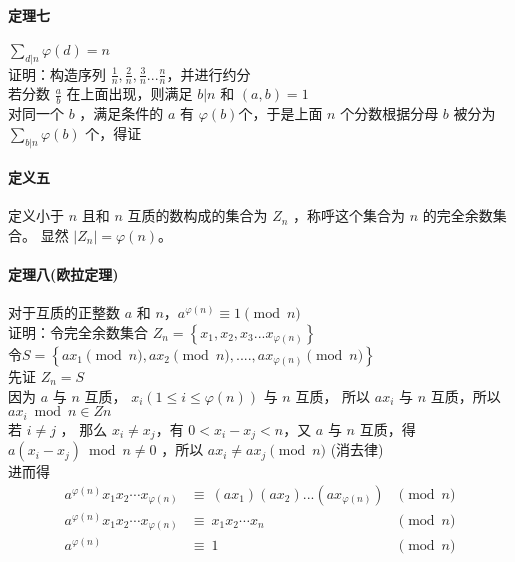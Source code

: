 	\paragraph{定理七}$\displaystyle \sum_{d|n}\varphi(d)=n$\\
	证明：构造序列 $\displaystyle \frac{1}{n},\frac{2}{n},\frac{3}{n}...\frac{n}{n}$，并进行约分\\
	若分数 $\frac{a}{b}$ 在上面出现，则满足 $b|n$ 和 $(a,b)=1$\\
	对同一个 $b$ ，满足条件的 $a$ 有 $\varphi(b)$个，于是上面 $n$ 个分数根据分母 $b$ 被分为 $\sum_{b|n}\varphi(b) $ 个，得证\\
	\paragraph{定义五}定义小于 $n$ 且和 $n$ 互质的数构成的集合为 $Z_n$ ，称呼这个集合为 $n$ 的完全余数集合。 显然 $\left|Z_n\right|=\varphi(n) $。
	\paragraph{定理八(欧拉定理)}对于互质的正整数 $a$ 和 $n$，$a^{\varphi(n)}\equiv1\pmod n$\\
	证明：令完全余数集合 $Z_n=\left \{x_1,x_2,x_3...x_{\varphi(n)}\right\}$
	\\令$S=\left\{ax_1\pmod n,ax_2\pmod n,....,ax_{\varphi(n)}\pmod n\right\}$ \\
	先证 $Z_n=S$\\
	因为 $a$ 与 $n$ 互质， $x_i(1 \le i \le \varphi(n))$ 与 $n$ 互质， 所以 $a x_i$  与 $n$ 互质，所以 $a  x_i  \bmod n \in Zn$ \\
	若 $i \neq j$ ， 那么 $x_i \neq x_j$，有 $0 < x_i - x_j < n$，又 $a$ 与 $n$ 互质，得 $a  ( x_i - x_j ) \bmod n \neq 0$  ，所以 $a  x_i  \neq a  x_j \pmod n$ (消去律)\\
	进而得\\
	$$
	\begin{aligned}
		a^{\varphi(n)}x_1x_2\cdots x_{\varphi(n)}&\equiv~(ax_1)(ax_2)...(ax_{\varphi(n)}) &\pmod n\\ 
		a^{\varphi(n)}x_1x_2\cdots x_{\varphi(n)}& \equiv~ x_1x_2\cdots x_n &\pmod n\\
		a^{\varphi(n)}&\equiv~1 &\pmod n\\
	\end{aligned}
	$$
